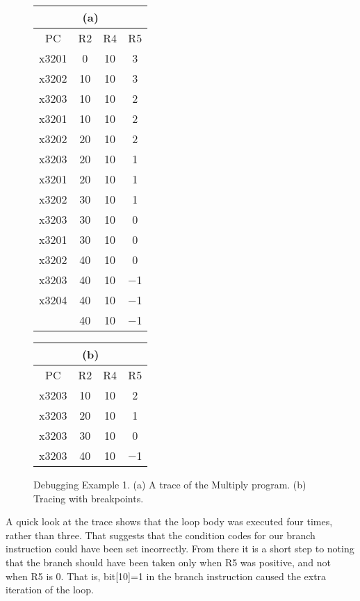 \documentclass{patt}
\begin{document}
\setcounter{figure}{4}
\begin{figure}
\begin{minipage}{36pc}
\noindent\small
{\renewcommand{\tabcolsep}{5pt}
\noindent\hspace*{60.5pt}\begin{tabular}{| c | c | c | c |}
\multicolumn{4}{c}{(a)}\\[4pt]\hline
PC    & R2   &  R4   &  R5 \\
\hline
x3201 & 0    &  10  &   3  \\
x3202 & 10   &  10  &   3  \\
x3203 & 10   &  10  &   2  \\
x3201 & 10   &  10  &   2  \\
x3202 & 20   &  10  &   2  \\
x3203 & 20   &  10  &   1  \\
x3201 & 20   &  10  &   1  \\
x3202 & 30   &  10  &   1  \\
x3203 & 30   &  10  &   0  \\
x3201 & 30   &  10  &   0  \\
x3202 & 40   &  10  &   0  \\
x3203 & 40   &  10  &   $-$1 \\
x3204 & 40   &  10  &   $-$1 \\
\hline
      & 40   &  10  &   $-$1 \\
\hline
\end{tabular}%
\hspace*{36pt}%
\begin{tabular}{| c | c | c | c |}
\multicolumn{4}{c}{(b)}\\[4pt]\hline
PC    & R2   &  R4   &  R5 \\
\hline
x3203 & 10   &  10  &   2  \\
x3203 & 20   &  10  &   1  \\
x3203 & 30   &  10  &   0  \\
x3203 & 40   &  10  &   $-$1 \\
\hline
\end{tabular}
\vspace{4pt}
\caption{Debugging Example 1. (a) A trace of the Multiply program.  (b)
  Tracing with breakpoints.\label{fig:onlinedebug_debug}}}
\end{minipage}
\end{figure}

A quick look at the trace shows that the loop body was executed 
four times, rather than three.  That suggests that the condition codes 
for our branch instruction could have been set incorrectly.  From there 
it is a short step to noting that the branch should have been taken only 
when R5 was positive, and not when R5 is 0.  That is, bit[10]=1 in the 
branch instruction caused the extra iteration of the loop.
\end{document}
